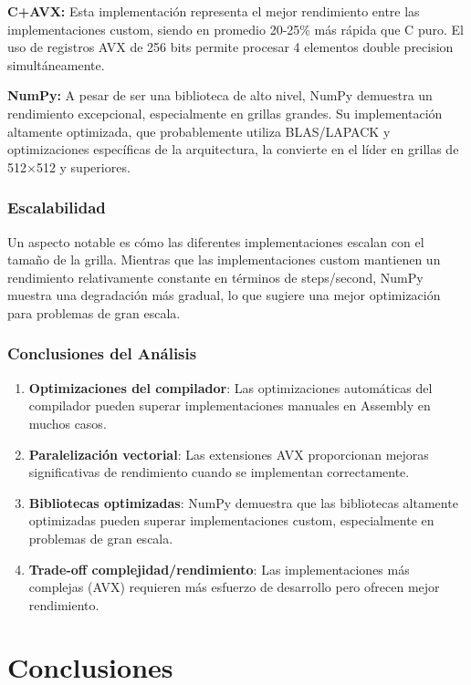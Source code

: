 \documentclass[a4paper]{article}
\begin{document}
\textbf{C+AVX:} Esta implementación representa el mejor rendimiento entre las implementaciones custom, siendo en promedio 20-25\% más rápida que C puro. El uso de registros AVX de 256 bits permite procesar 4 elementos double precision simultáneamente.

\textbf{NumPy:} A pesar de ser una biblioteca de alto nivel, NumPy demuestra un rendimiento excepcional, especialmente en grillas grandes. Su implementación altamente optimizada, que probablemente utiliza BLAS/LAPACK y optimizaciones específicas de la arquitectura, la convierte en el líder en grillas de 512×512 y superiores.

\subsubsection{Escalabilidad}

Un aspecto notable es cómo las diferentes implementaciones escalan con el tamaño de la grilla. Mientras que las implementaciones custom mantienen un rendimiento relativamente constante en términos de steps/second, NumPy muestra una degradación más gradual, lo que sugiere una mejor optimización para problemas de gran escala.

\subsubsection{Conclusiones del Análisis}

\begin{enumerate}
    \item \textbf{Optimizaciones del compilador}: Las optimizaciones automáticas del compilador pueden superar implementaciones manuales en Assembly en muchos casos.
    \item \textbf{Paralelización vectorial}: Las extensiones AVX proporcionan mejoras significativas de rendimiento cuando se implementan correctamente.
    \item \textbf{Bibliotecas optimizadas}: NumPy demuestra que las bibliotecas altamente optimizadas pueden superar implementaciones custom, especialmente en problemas de gran escala.
    \item \textbf{Trade-off complejidad/rendimiento}: Las implementaciones más complejas (AVX) requieren más esfuerzo de desarrollo pero ofrecen mejor rendimiento.
\end{enumerate}

\section{Conclusiones}
\end{document}
